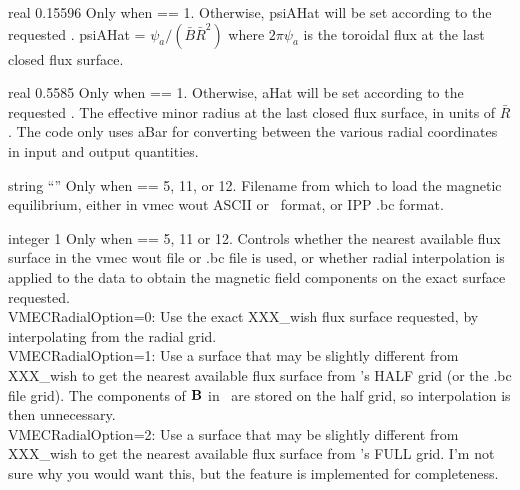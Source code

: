 \myhrule

{real}
{0.15596}
{Only when  == 1. Otherwise, {\ttfamily psiAHat} will be set according to the requested .}
{{\ttfamily psiAHat} = $\psi_a / (\bar{B} \bar{R}^2)$
where $2 \pi \psi_a$ is the toroidal flux at the last closed flux surface.}

\myhrule

{real}
{0.5585}
{Only when  == 1. Otherwise, {\ttfamily aHat} will be set according to the requested .}
{The effective minor radius at the last closed flux surface, in units of $\bar{R}$.
The code only uses {\ttfamily aBar} for converting between the various radial coordinates in input and output quantities.
}

\myhrule

{string}
{``''}
{Only when  == 5, 11, or 12.}
{Filename from which to load the magnetic equilibrium, either in {\ttfamily vmec wout} ASCII or \netCDF~format, or IPP {\ttfamily .bc} format.}

\myhrule

{integer}
{1}
{Only when  == 5, 11 or 12.}
{Controls whether the nearest available flux surface in the {\ttfamily
    vmec wout} file or {\ttfamily .bc} file is used, or whether radial interpolation is applied to the data
to obtain the magnetic field components on the exact surface requested.\\

{\ttfamily VMECRadialOption}=0: Use the exact {\ttfamily XXX\_wish} flux surface requested, by interpolating from the radial grid.\\

{\ttfamily VMECRadialOption}=1: Use a surface that may be slightly
different from {\ttfamily XXX\_wish} to get the nearest available flux
surface from \vmec's HALF grid (or the {\ttfamily .bc} file grid).  
   The components of ${\mathbf B}$ in \vmec~are stored on the half grid, so interpolation is then unnecessary.\\

{\ttfamily VMECRadialOption}=2: Use a surface that may be slightly different from {\ttfamily XXX\_wish} to get the nearest available flux surface from \vmec's FULL grid.
I'm not sure why you would want this, but the feature is implemented for completeness.
}

\myhrule

